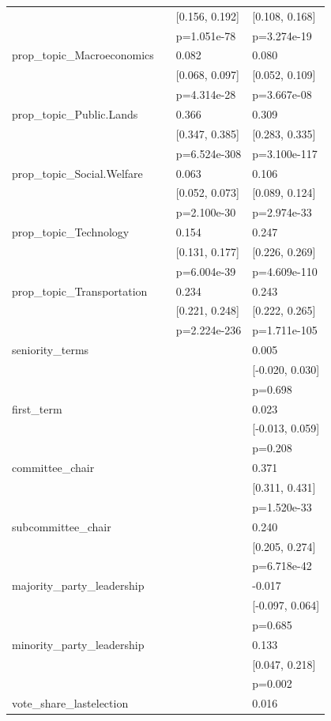 \begin{tabular}{llll}
&  & [0.156, 0.192] & [0.108, 0.168] \\
&  & p=1.051e-78 & p=3.274e-19 \\
prop_topic_Macroeconomics &  & 0.082 & 0.080 \\
&  & [0.068, 0.097] & [0.052, 0.109] \\
&  & p=4.314e-28 & p=3.667e-08 \\
prop_topic_Public.Lands &  & 0.366 & 0.309 \\
&  & [0.347, 0.385] & [0.283, 0.335] \\
&  & p=6.524e-308 & p=3.100e-117 \\
prop_topic_Social.Welfare &  & 0.063 & 0.106 \\
&  & [0.052, 0.073] & [0.089, 0.124] \\
&  & p=2.100e-30 & p=2.974e-33 \\
prop_topic_Technology &  & 0.154 & 0.247 \\
&  & [0.131, 0.177] & [0.226, 0.269] \\
&  & p=6.004e-39 & p=4.609e-110 \\
prop_topic_Transportation &  & 0.234 & 0.243 \\
&  & [0.221, 0.248] & [0.222, 0.265] \\
&  & p=2.224e-236 & p=1.711e-105 \\
seniority_terms &  &  & 0.005 \\
&  &  & [-0.020, 0.030] \\
&  &  & p=0.698 \\
first_term &  &  & 0.023 \\
&  &  & [-0.013, 0.059] \\
&  &  & p=0.208 \\
committee_chair &  &  & 0.371 \\
&  &  & [0.311, 0.431] \\
&  &  & p=1.520e-33 \\
subcommittee_chair &  &  & 0.240 \\
&  &  & [0.205, 0.274] \\
&  &  & p=6.718e-42 \\
majority_party_leadership &  &  & -0.017 \\
&  &  & [-0.097, 0.064] \\
&  &  & p=0.685 \\
minority_party_leadership &  &  & 0.133 \\
&  &  & [0.047, 0.218] \\
&  &  & p=0.002 \\
vote_share_lastelection &  &  & 0.016 \\

\end{tabular}
